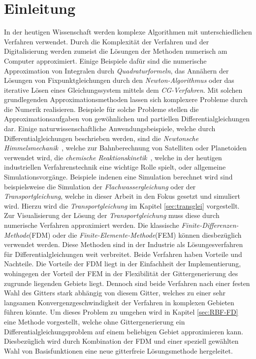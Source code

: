 \documentclass[12pt,titlepage]{article}
\begin{document}
\section{Einleitung}
In der heutigen Wissenschaft werden komplexe Algorithmen mit unterschiedlichen Verfahren verwendet. Durch die Komplexität der Verfahren und der Digitalisierung werden zumeist die Lösungen der Methoden numerisch am Computer approximiert. Einige Beispiele dafür sind die numerische Approximation von Integralen durch \textit{Quadraturformeln}, das Annähern der Lösungen von Fixpunktgleichungen durch den \textit{Newton-Algorithmus} oder das iterative Lösen eines Gleichungssystem mittels dem \textit{CG-Verfahren}. Mit solchen grundlegenden Approximationsmethoden lassen sich komplexere Probleme durch die Numerik realisieren. Beispiele für solche Probleme stellen die Approximationsaufgaben von gewöhnlichen und partiellen Differentialgleichungen dar. Einige naturwissenschaftliche Anwendungsbeispiele, welche durch Differentialgleichungen beschrieben werden, sind die \textit{Newtonsche Himmelsmechanik}~\cite{deuflhard2013gewohnliche}, welche zur Bahnberechnung von Satelliten oder Planetoiden verwendet wird, die \textit{chemische Reaktionskinetik}~\cite{deuflhard2013gewohnliche}, welche in der heutigen industriellen Verfahrenstechnik eine wichtige Rolle spielt, oder allgemeine Simulationsvorgänge. Beispiele indenen eine Simulation berechnet wird sind beispielsweise die Simulation der \textit{Flachwassergleichung} oder der \textit{Transportgleichung}, welche in dieser Arbeit in den Fokus gesetzt und simuliert wird. Hierzu wird die \textit{Transportgleichung} im Kapitel \ref{sec:transglei} vorgestellt.\\
Zur Visualisierung der Lösung der \textit{Transportgleichung} muss diese durch numerische Verfahren approximiert werden. Die klassische \textit{Finite-Differenzen-Methode}(FDM) oder die \textit{Finite-Elemente-Methode}(FEM) können diesbezüglich verwendet werden. Diese Methoden sind in der Industrie als Lösungesverfahren für Differentialgleichungen weit verbreitet. Beide Verfahren haben Vorteile und Nachteile. Die Vorteile der FDM liegt in der Einfachheit der Implementierung, wohingegen der Vorteil der FEM in der Flexibilität der Gittergenerierung des zugrunde liegenden Gebiets liegt. Dennoch sind beide Verfahren nach einer festen Wahl des Gitters stark abhängig von diesem Gitter, welches zu einer sehr langsamen Konvergenzgeschwindigkeit der Verfahren in komplexen Gebieten führen könnte. Um dieses Problem zu umgehen wird in Kapitel \ref{sec:RBF-FD} eine Methode vorgestellt, welche ohne Gittergenerierung ein Differentialgleichungsproblem auf einem beliebigen Gebiet approximieren kann. Diesbezüglich wird durch Kombination der FDM und einer speziell gewählten Wahl von Basisfunktionen eine neue gitterfreie Lösungsmethode hergeleitet.\\
\end{document}
